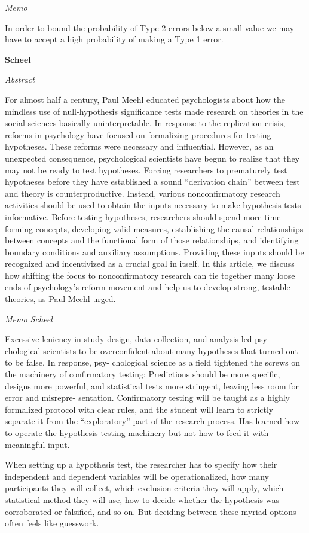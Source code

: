 \documentclass[
]{book}
\begin{document}
\emph{Memo}

In order to bound the probability of Type 2 errors below a small value
we may have to accept a high probability of making a Type 1 error.

\textbf{Scheel}

\emph{Abstract}

For almost half a century, Paul Meehl educated psychologists about how the mindless use of null-hypothesis significance
tests made research on theories in the social sciences basically uninterpretable. In response to the replication crisis,
reforms in psychology have focused on formalizing procedures for testing hypotheses. These reforms were necessary
and influential. However, as an unexpected consequence, psychological scientists have begun to realize that they
may not be ready to test hypotheses. Forcing researchers to prematurely test hypotheses before they have established
a sound ``derivation chain'' between test and theory is counterproductive. Instead, various nonconfirmatory research
activities should be used to obtain the inputs necessary to make hypothesis tests informative. Before testing hypotheses,
researchers should spend more time forming concepts, developing valid measures, establishing the causal relationships
between concepts and the functional form of those relationships, and identifying boundary conditions and auxiliary
assumptions. Providing these inputs should be recognized and incentivized as a crucial goal in itself. In this article, we
discuss how shifting the focus to nonconfirmatory research can tie together many loose ends of psychology's reform
movement and help us to develop strong, testable theories, as Paul Meehl urged.

\emph{Memo Scheel}

Excessive leniency
in study design, data collection, and analysis led psy-
chological scientists to be overconfident about many
hypotheses that turned out to be false. In response, psy-
chological science as a field tightened the screws on the
machinery of confirmatory testing: Predictions should be
more specific, designs more powerful, and statistical tests
more stringent, leaving less room for error and misrepre-
sentation. Confirmatory testing will be taught as a highly
formalized protocol with clear rules, and the student will
learn to strictly separate it from the ``exploratory'' part of
the research process. Has learned how
to operate the hypothesis-testing machinery but not
how to feed it with meaningful input.

When setting up a hypothesis test, the researcher has to specify
how their independent and dependent variables will
be operationalized, how many participants they will
collect, which exclusion criteria they will apply, which
statistical method they will use, how to decide whether
the hypothesis was corroborated or falsified, and so on.
But deciding between these myriad options often feels
like guesswork.
\end{document}
